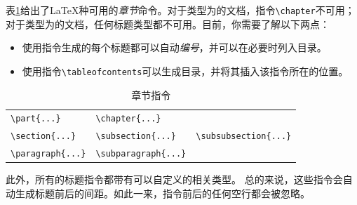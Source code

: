 表\ref{tab:2.3}给出了\LaTeX 种可用的\emph{章节}命令。对于类型为的文档，指令\verb|\chapter|不可用；对于类型为的文档，任何标题类型都不可用。目前，你需要了解以下两点：

\begin{itemize}
  \item 使用指令生成的每个标题都可以自动\emph{编号}，并可以在必要时列入目录。
  \item 使用指令\verb|\tableofcontents|可以生成目录，并将其插入该指令所在的位置。
\end{itemize}

\begin{table}[h]
  \centering
  \begin{tabular}{|l|l|l|}
    \hline
    \verb|\part{...}| & \verb|\chapter{...}| & \\
    \verb|\section{...}| & \verb|\subsection{...}| & \verb|\subsubsection{...}| \\
    \verb|\paragraph{...}| & \verb|\subparagraph{...}| &  \\
    \hline
  \end{tabular}
  \caption{章节指令}
  \label{tab:2.3}
\end{table}

\begin{ii}
此外，所有的标题指令都带有可以自定义的相关类型。%
总的来说，这些指令会自动生成标题前后的间距。如此一来，指令前后的任何空行都会被忽略。
\end{ii}

